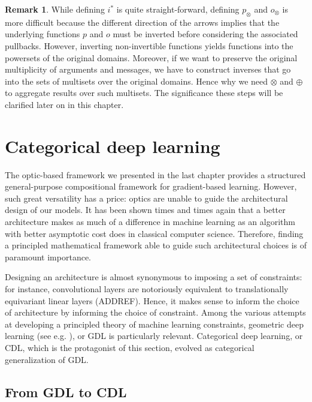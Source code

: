 \documentclass[11pt,a4paper,openright,twoside]{report}
\theoremstyle{plain}
\theoremstyle{definition}
\newtheorem{remark}[proposition]{Remark}
\begin{document}
\begin{remark}
  While defining $i^*$ is quite straight-forward, defining $p_{\otimes}$ and $o_{\otimes}$ is more difficult because the different direction of the arrows implies that the underlying functions $p$ and $o$ must be inverted before considering the associated pullbacks. However, inverting non-invertible functions yields functions into the powersets of the original domains. Moreover, if we want to preserve the original multiplicity of arguments and messages, we have to construct inverses that go into the sets of multisets over the original domains. Hence why we need $\otimes$ and $\oplus$ to aggregate results over such multisets.
  The significance these steps will be clarified later on in this chapter.
\end{remark}



\section{Categorical deep learning}

The optic-based framework we presented in the last chapter provides a structured general-purpose compositional framework for gradient-based learning. However, such great versatility has a price: optics are unable to guide the architectural design of our models. It has been shown times and times again that a better architecture makes as much of a difference in machine learning as an algorithm with better asymptotic cost does in classical computer science. 
Therefore, finding a principled mathematical framework able to guide such architectural choices is of paramount importance. 


Designing an architecture is almost synonymous to imposing a set of constraints: for instance, convolutional layers are notoriously equivalent to translationally equivariant linear layers (ADDREF).
Hence, it makes sense to inform the choice of architecture by informing the choice of constraint. Among the various attempts at developing a principled theory of machine learning constraints, geometric deep learning (see e.g. \cite{bronstein2021geometric}), or GDL is particularly relevant. Categorical deep learning, or CDL, which is the protagonist of this section, evolved as categorical generalization of GDL.


\subsection{From GDL to CDL}
\end{document}
